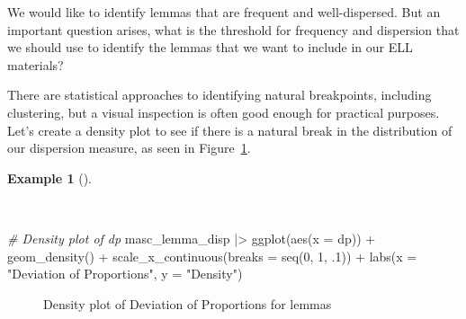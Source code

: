 \documentclass[
  letterpaper,
  krantz1]{latex/krantz-mod}
\newenvironment{Shaded}{\begin{snugshade}}{\end{snugshade}}
\newcommand{\AttributeTok}[1]{\textcolor[rgb]{0.00,0.00,0.00}{#1}}
\newcommand{\CommentTok}[1]{\textcolor[rgb]{0.00,0.00,0.00}{\textit{#1}}}
\newcommand{\DecValTok}[1]{\textcolor[rgb]{0.00,0.00,0.00}{#1}}
\newcommand{\FunctionTok}[1]{\textcolor[rgb]{0.00,0.00,0.00}{#1}}
\newcommand{\NormalTok}[1]{\textcolor[rgb]{0.00,0.00,0.00}{#1}}
\newcommand{\SpecialCharTok}[1]{\textcolor[rgb]{0.00,0.00,0.00}{#1}}
\newcommand{\StringTok}[1]{\textcolor[rgb]{0.00,0.00,0.00}{#1}}
\theoremstyle{definition}
\newtheorem{example}{Example}[chapter]
\theoremstyle{definition}
\theoremstyle{remark}
\begin{document}
We would like to identify lemmas that are frequent and well-dispersed.
But an important question arises, what is the threshold for frequency
and dispersion that we should use to identify the lemmas that we want to
include in our ELL materials?

There are statistical approaches to identifying natural breakpoints,
including clustering, but a visual inspection is often good enough for
practical purposes. Let's create a density plot to see if there is a
natural break in the distribution of our dispersion measure, as seen in
Figure~\ref{fig-explore-masc-dp-density}.

\begin{example}[]\protect\hypertarget{exm-explore-masc-dp-density}{}\label{exm-explore-masc-dp-density}

~

\begin{Shaded}
\begin{Highlighting}[numbers=left,,]
\CommentTok{\# Density plot of dp}
\NormalTok{masc\_lemma\_disp }\SpecialCharTok{|\textgreater{}}
  \FunctionTok{ggplot}\NormalTok{(}\FunctionTok{aes}\NormalTok{(}\AttributeTok{x =}\NormalTok{ dp)) }\SpecialCharTok{+}
  \FunctionTok{geom\_density}\NormalTok{() }\SpecialCharTok{+}
  \FunctionTok{scale\_x\_continuous}\NormalTok{(}\AttributeTok{breaks =} \FunctionTok{seq}\NormalTok{(}\DecValTok{0}\NormalTok{, }\DecValTok{1}\NormalTok{, .}\DecValTok{1}\NormalTok{)) }\SpecialCharTok{+}
  \FunctionTok{labs}\NormalTok{(}\AttributeTok{x =} \StringTok{"Deviation of Proportions"}\NormalTok{, }\AttributeTok{y =} \StringTok{"Density"}\NormalTok{)}
\end{Highlighting}
\end{Shaded}

\begin{figure}[!htb]


\caption{\label{fig-explore-masc-dp-density}Density plot of Deviation of
Proportions for lemmas}

\end{figure}%

\end{example}
\end{document}
